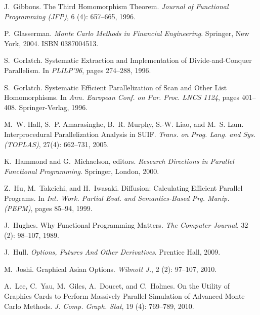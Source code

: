 \documentclass{sigplanconf}  %
\begin{document}
\begin{thebibliography}{49}
J.~Gibbons.
\newblock The {T}hird {H}omomorphism {T}heorem.
\newblock \emph{Journal of Functional Programming (JFP)}, 6
  (4): 657--665, 1996.

P.~Glasserman.
\newblock \emph{Monte Carlo {M}ethods in {F}inancial {E}ngineering}.
\newblock Springer, New York, 2004.
\newblock ISBN 0387004513.

S.~Gorlatch.
\newblock Systematic {E}xtraction and {I}mplementation of
  {D}ivide-and-{C}onquer {P}arallelism.
\newblock In \emph{PLILP'96}, pages 274--288, 1996{}.

S.~Gorlatch.
\newblock Systematic {E}fficient {P}arallelization of {S}can and {O}ther {L}ist
  {H}omomorphisms.
\newblock In \emph{Ann. European Conf. on Par. Proc. LNCS 1124}, pages
  401--408. Springer-Verlag, 1996{}.

M.~W. Hall, S.~P. Amarasinghe, B.~R. Murphy, S.-W. Liao, and M.~S. Lam.
\newblock Interprocedural {P}arallelization {A}nalysis in {SUIF}.
\newblock \emph{Trans. on Prog. Lang. and Sys. (TOPLAS)}, 27(4):
  662--731, 2005.

K.~Hammond and G.~Michaelson, editors.
\newblock \emph{{Research Directions in Parallel Functional Programming}}.
\newblock Springer, London, 2000.

Z.~Hu, M.~Takeichi, and H.~Iwasaki.
\newblock Diffusion: {C}alculating {E}fficient {P}arallel {P}rograms.
\newblock In \emph{Int. Work. Partial Eval. and Semantics-Based Prg. Manip.
  (PEPM)}, pages 85--94, 1999.

J.~Hughes.
\newblock Why {F}unctional {P}rogramming {M}atters.
\newblock \emph{The Computer Journal}, 32 (2): 98--107, 1989.

J.~Hull.
\newblock \emph{Options, {F}utures {A}nd {O}ther {D}erivatives}.
\newblock Prentice Hall, 2009.

M.~Joshi.
\newblock Graphical {A}sian {O}ptions.
\newblock \emph{Wilmott J.}, 2 (2): 97--107, 2010.

A.~Lee, C.~Yau, M.~Giles, A.~Doucet, and C.~Holmes.
\newblock On the {U}tility of {G}raphics {C}ards to {P}erform {M}assively
  {P}arallel {S}imulation of {A}dvanced {M}onte {C}arlo {M}ethods.
\newblock \emph{J. Comp. Graph. Stat}, 19 (4): 769--789,
  2010.


\end{thebibliography}
\end{document}
